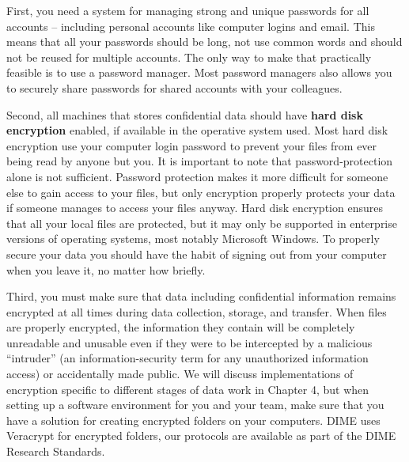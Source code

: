 {First, you need a system for managing strong and unique passwords for
all accounts -- including personal accounts like computer logins and email.
This means that all your passwords should be long,
not use common words and should not be reused for multiple accounts.
The only way to make that practically feasible is to use a password manager.
Most password managers also allows you to securely share passwords
for shared accounts with your colleagues.

Second, all machines that stores confidential data
should have \textbf{hard disk encryption} enabled,
if available in the operative system used.
Most hard disk encryption use your computer login password to
prevent your files from ever being read by anyone but you.
It is important to note that password-protection alone is not sufficient.
Password protection makes it more difficult for someone else to gain access to your files,
but only encryption properly protects your data if someone manages to access your files anyway.
Hard disk encryption ensures that all your local files are protected,
but it may only be supported in enterprise versions of operating systems,
most notably Microsoft Windows.
To properly secure your data you should have the habit of
signing out from your computer when you leave it,
no matter how briefly.

Third, you must make sure that data including confidential information
remains encrypted at all times during data collection, storage, and transfer.
When files are properly encrypted,
the information they contain will be completely unreadable and unusable
even if they were to be intercepted by a malicious ``intruder''
(an information-security term for any unauthorized information access)
or accidentally made public.
We will discuss implementations of encryption
specific to different stages of data work in Chapter 4,
but when setting up a software environment for you and your team,
make sure that you have a solution for creating encrypted folders on your computers.
DIME uses Veracrypt for encrypted folders,
our protocols are available as part of the DIME Research Standards.

}
